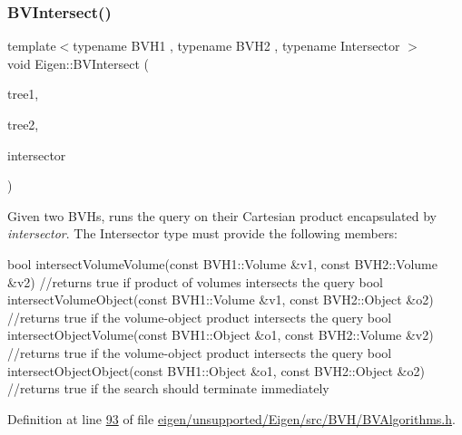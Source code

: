 \subsubsection{\texorpdfstring{B\+V\+Intersect()}{BVIntersect()}\hspace{0.1cm}{\footnotesize\ttfamily [2/2]}}
{\footnotesize\ttfamily template$<$typename B\+V\+H1 , typename B\+V\+H2 , typename Intersector $>$ \\
void Eigen\+::\+B\+V\+Intersect (\begin{DoxyParamCaption}\item[{const B\+V\+H1 \&}]{tree1,  }\item[{const B\+V\+H2 \&}]{tree2,  }\item[{Intersector \&}]{intersector }\end{DoxyParamCaption})}

Given two B\+VH\textquotesingle{}s, runs the query on their Cartesian product encapsulated by {\itshape intersector}. The Intersector type must provide the following members\+:
\begin{DoxyCode}
\textcolor{keywordtype}{bool} intersectVolumeVolume(\textcolor{keyword}{const} BVH1::Volume &v1, \textcolor{keyword}{const} BVH2::Volume &v2) \textcolor{comment}{//returns true if product of
       volumes intersects the query}
\textcolor{keywordtype}{bool} intersectVolumeObject(\textcolor{keyword}{const} BVH1::Volume &v1, \textcolor{keyword}{const} BVH2::Object &o2) \textcolor{comment}{//returns true if the
       volume-object product intersects the query}
\textcolor{keywordtype}{bool} intersectObjectVolume(\textcolor{keyword}{const} BVH1::Object &o1, \textcolor{keyword}{const} BVH2::Volume &v2) \textcolor{comment}{//returns true if the
       volume-object product intersects the query}
\textcolor{keywordtype}{bool} intersectObjectObject(\textcolor{keyword}{const} BVH1::Object &o1, \textcolor{keyword}{const} BVH2::Object &o2) \textcolor{comment}{//returns true if the search
       should terminate immediately}
\end{DoxyCode}
 

Definition at line \hyperlink{eigen_2unsupported_2_eigen_2src_2_b_v_h_2_b_v_algorithms_8h_source_l00093}{93} of file \hyperlink{eigen_2unsupported_2_eigen_2src_2_b_v_h_2_b_v_algorithms_8h_source}{eigen/unsupported/\+Eigen/src/\+B\+V\+H/\+B\+V\+Algorithms.\+h}.

\mbox{\label{namespace_eigen_adcbe73ac1482eacab0e18ee32c25508e}} 
